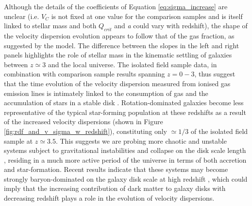 \documentclass[fleqn,usenatbib]{mnras}
\begin{document}
\noindent
Although the details of the coefficients of Equation \ref{eq:sigma_increase} are unclear (i.e. $V_{C}$ is not fixed at one value for the comparison samples and is itself linked to stellar mass and both $Q_{crit}$ and {\it a} could vary with redshift), the shape of the velocity dispersion evolution appears to follow that of the gas fraction, as suggested by the model.
The difference between the slopes in the left and right panels highlights the role of stellar mass in the kinematic settling of galaxies between $z\simeq3$ and the local universe. 
The isolated field sample data, in combination with comparison sample results spanning $z=0-3$, thus suggest that the time evolution of the velocity dispersion measured from ionised gas emission lines is intimately linked to the consumption of gas and the accumulation of stars in a stable disk \citep[e.g.][]{Law2009,Law2012b,Law2012c,Wisnioski2015}.
Rotation-dominated galaxies become less representative of the typical star-forming population at these redshifts as a result of the increased velocity dispersions (shown in Figure \ref{fig:rdf_and_v_sigma_w_redshift}), constituting only $\simeq1/3$ of the isolated field sample at $z\simeq3.5$.
This suggests we are probing more chaotic and unstable systems subject to gravitational instabilities and collapse on the disk scale length \citep{Burkert2010,Genzel2011}, residing in a much more active period of the universe in terms of both accretion and star-formation.
Recent results indicate that these systems may become strongly baryon-dominated on the galaxy disk scale at high redshift \citep{Ubler2017,Lang2017,Genzel2017}, which could imply that the increasing contribution of dark matter to galaxy disks with decreasing redshift plays a role in the evolution of velocity dispersions.   
\end{document}
